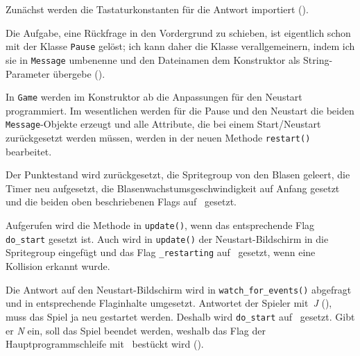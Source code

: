 Zunächst werden die Tastaturkonstanten für die Antwort importiert ().


Die Aufgabe, eine Rückfrage in den Vordergrund zu schieben, ist eigentlich schon mit der Klasse \texttt{Pause} gelöst; ich kann daher die Klasse verallgemeinern, indem ich sie in \texttt{Message} umbenenne und den Dateinamen dem Konstruktor als String-Parameter übergebe ().



In \texttt{Game} werden im Konstruktor ab  die Anpassungen für den Neustart programmiert. Im wesentlichen werden für die Pause und den Neustart die beiden \texttt{Message}-Objekte erzeugt und alle Attribute, die bei einem Start/Neustart zurückgesetzt werden müssen, werden in der neuen Methode \texttt{restart()} bearbeitet.


Der Punktestand wird zurückgesetzt, die Spritegroup von den Blasen geleert, die Timer neu aufgesetzt, die Blasenwachstumsgeschwindigkeit auf Anfang gesetzt und die beiden oben beschriebenen Flags auf \false\ gesetzt.



Aufgerufen wird die Methode in \texttt{update()}, wenn das entsprechende Flag \texttt{do\_start} gesetzt ist. Auch wird in \texttt{update()} der Neustart-Bildschirm in die Spritegroup eingefügt und das Flag \texttt{\_restarting} auf \true\ gesetzt, wenn eine Kollision erkannt wurde. 



Die Antwort auf den Neustart-Bildschirm wird in \texttt{watch\_for\_events()} abgefragt und in entsprechende Flaginhalte umgesetzt. Antwortet der Spieler mit~\emph{J} (), muss das Spiel ja neu gestartet werden. Deshalb wird \texttt{do\_start} auf \true\ gesetzt. Gibt er \emph{N} ein, soll das Spiel beendet werden, weshalb das Flag der Hauptprogrammschleife mit \false\ bestückt wird ().

